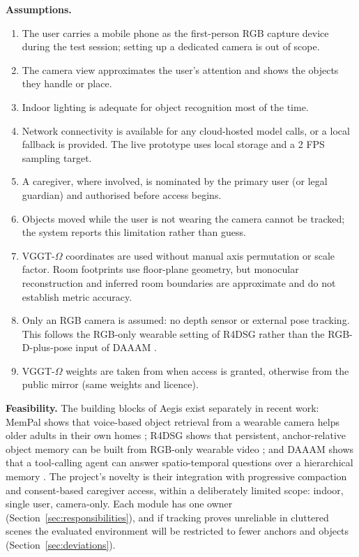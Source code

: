 \textbf{Assumptions.}
\begin{enumerate}[label=\textbf{A\arabic*.},leftmargin=3em]
\item The user carries a mobile phone as the first-person RGB capture device during the test session; setting up a dedicated camera is out of scope.
\item The camera view approximates the user's attention and shows the objects
they handle or place.
\item Indoor lighting is adequate for object recognition most of the time.
\item Network connectivity is available for any cloud-hosted model calls, or a
local fallback is provided. The live prototype uses local storage and a 2 FPS sampling target.
\item A caregiver, where involved, is nominated by the primary user (or legal
guardian) and authorised before access begins.
\item Objects moved while the user is not wearing the camera cannot be tracked;
the system reports this limitation rather than guess.
\item VGGT-$\Omega$ coordinates are used without manual axis permutation or
scale factor. Room footprints use floor-plane geometry, but monocular
reconstruction and inferred room boundaries are approximate and do not
establish metric accuracy.
\item Only an RGB camera is assumed: no depth sensor or external pose tracking.
This follows the RGB-only wearable setting of R4DSG \cite{r4dsg2026} rather
than the RGB-D-plus-pose input of DAAAM \cite{daaam2026}.
\item VGGT-$\Omega$ weights are taken from  when access is granted, otherwise from the public mirror  (same weights and licence).
\end{enumerate}

\textbf{Feasibility.} The building blocks of Aegis exist separately in recent
work: MemPal shows that voice-based object retrieval from a wearable camera
helps older adults in their own homes \cite{mempal2025}; R4DSG shows that
persistent, anchor-relative object memory can be built from RGB-only wearable
video \cite{r4dsg2026}; and DAAAM shows that a tool-calling agent can answer
spatio-temporal questions over a hierarchical memory \cite{daaam2026}. The
project's novelty is their integration with progressive compaction and
consent-based caregiver access, within a deliberately limited scope: indoor,
single user, camera-only. Each module has one owner (Section~\ref{sec:responsibilities}), and if
tracking proves unreliable in cluttered scenes the evaluated environment will
be restricted to fewer anchors and objects (Section~\ref{sec:deviations}).

